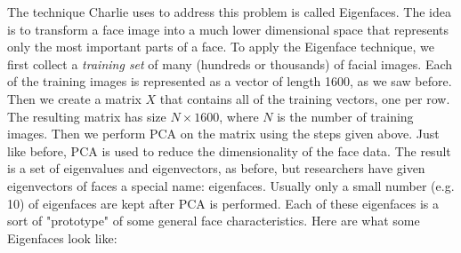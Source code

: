 The technique Charlie uses to address this problem is called Eigenfaces. The idea is to transform a face image into a much lower dimensional space that represents only the most important parts of a face. To apply the Eigenface technique, we first collect a \emph{training set} of many (hundreds or thousands) of facial images. Each of the training images is represented as a vector of length 1600, as we saw before. Then we create a matrix $X$ that contains all of the training vectors, one per row. The resulting matrix has size $N\times 1600$, where $N$ is the number of training images. Then we perform PCA on the matrix using the steps given above. Just like before, PCA is used to reduce the dimensionality of the face data. The result is a set of eigenvalues and eigenvectors, as before, but researchers have given eigenvectors of faces a special name: eigenfaces. Usually only a small number (e.g. 10) of eigenfaces are kept after PCA is performed. Each of these eigenfaces is a sort of "prototype" of some general face characteristics. Here are what some Eigenfaces look like: \\
